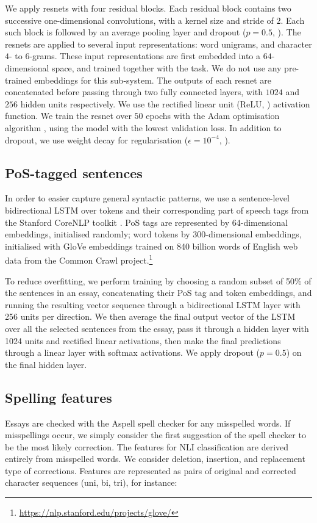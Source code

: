 \documentclass[11pt,letterpaper]{article}
\begin{document}
We apply resnets with four residual blocks.
Each residual block contains two successive one-dimensional convolutions, with a kernel size and stride of $2$.
Each such block is followed by an average pooling layer and dropout ($p=0.5$, \citet{dropout}).
The resnets are applied to several input representations: word unigrams, and character $4$- to $6$-grams.
These input representations are first embedded into a $64$-dimensional space, and trained together with the task.
We do not use any pre-trained embeddings for this sub-system.
The outputs of each resnet are concatenated before passing through two fully connected layers, with $1024$ and $256$ hidden units respectively.
We use the rectified linear unit (ReLU, \citet{rectifier}) activation function.
We train the resnet over $50$ epochs with the Adam optimisation algorithm \citep{adam}, using the model with the lowest validation loss.
In addition to dropout, we use weight decay for regularisation ($\epsilon=10^{-4}$, \citet{weightdecay}).

\subsection{PoS-tagged sentences}
In order to easier capture general syntactic patterns, we use a sentence-level
bidirectional LSTM over tokens and their corresponding part of speech tags
from the Stanford CoreNLP toolkit \citep{Manning2014corenlp}.  PoS tags are
represented by
64-dimensional embeddings, initialised randomly;  word tokens by
300-dimensional embeddings, initialised with GloVe \citep{Pennington2014glove}
embeddings trained on 840 billion words of English web data from the Common
Crawl project.\footnote{\url{https://nlp.stanford.edu/projects/glove/}}

To reduce overfitting, we perform training by choosing a random subset of 50\%
of the sentences in an essay, concatenating their PoS tag and token
embeddings, and running the resulting vector sequence through a bidirectional
LSTM layer with 256 units per direction. We then average the final output
vector of the LSTM over all the selected sentences from the essay, pass it
through a hidden layer with 1024 units and rectified linear activations, then
make the final predictions through a linear layer with softmax activations.
We apply dropout ($p = 0.5$) on the final hidden layer.

\subsection{Spelling features}
Essays are checked with the Aspell spell checker for any misspelled words. If misspellings occur, we simply consider the first suggestion of the spell checker to be the most likely correction.
The features for NLI classification are derived entirely from misspelled words.
We consider deletion, insertion, and replacement type of corrections. Features are represented as pairs of original and corrected character sequences (uni, bi, tri), for instance:
\end{document}
